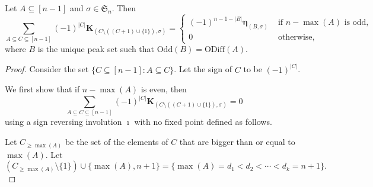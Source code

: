 \documentclass[10pt,a4paper]{amsart}
\newcommand{\boldeta}{{\boldsymbol{\eta}}}
\newcommand{\oddd}{\mathrm{ODiff}}
\newcommand{\odd}{\mathrm{Odd}}
\begin{document}
\begin{Lemma}\label{lem:M}
	Let $A\subseteq[n-1]$ and $\sigma\in\mathfrak{S}_n$. Then
	$$\sum_{A\subseteq C\subseteq[n-1]}(-1)^{|C|}\mathbf{K}_{(C\setminus((C+1)\cup\{1\}),\sigma)}=\begin{cases}
		(-1)^{n-1-|B|}\boldeta_{(B,\sigma)} & \text{ if }n-\max (A)\text{ is odd,}\\
		0 & \text{ otherwise,}
	\end{cases}$$
	where $B$ is the unique peak set such that $\odd(B)=\oddd(A)$.
	
	\end{Lemma}

\begin{proof}

Consider the set $\{C\subseteq [n-1]: A\subseteq C\}$. Let the sign of $C$ to be $(-1)^{|C|}$. 

We first show that  if $n-\max(A)$ is even, then
$$\sum_{A\subseteq C\subseteq[n-1]}(-1)^{|C|}\mathbf{K}_{(C\setminus((C+1)\cup\{1\}),\sigma)}=0$$ using a sign reversing involution $\imath$ with no fixed point defined as follows. 

Let $C_{\geq \max(A)}$ be the set of the elements of $C$ that are bigger than or equal to $\max(A)$. Let 
$$(C_{\geq \max(A)}\setminus \{1\})\cup \{\max(A),n+1\}=\{\max(A)=d_1<d_2<\cdots<d_k=n+1\}.$$ 


\end{proof}
\end{document}
